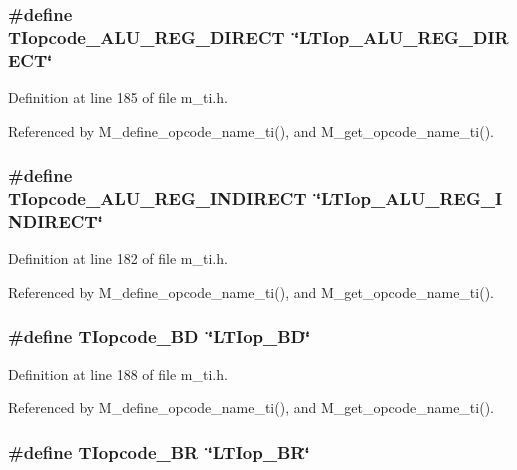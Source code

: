 \subsubsection{\setlength{\rightskip}{0pt plus 5cm}\#define TIopcode\_\-ALU\_\-REG\_\-DIRECT~\char`\"{}LTIop\_\-ALU\_\-REG\_\-DIRECT\char`\"{}}\label{m__ti_8h_d18c754ad75d2456e47ff1854d5aa6a5}




Definition at line 185 of file m\_\-ti.h.

Referenced by M\_\-define\_\-opcode\_\-name\_\-ti(), and M\_\-get\_\-opcode\_\-name\_\-ti().
\subsubsection{\setlength{\rightskip}{0pt plus 5cm}\#define TIopcode\_\-ALU\_\-REG\_\-INDIRECT~\char`\"{}LTIop\_\-ALU\_\-REG\_\-INDIRECT\char`\"{}}\label{m__ti_8h_09babc01669c01321d72d361b3ff69ce}




Definition at line 182 of file m\_\-ti.h.

Referenced by M\_\-define\_\-opcode\_\-name\_\-ti(), and M\_\-get\_\-opcode\_\-name\_\-ti().
\subsubsection{\setlength{\rightskip}{0pt plus 5cm}\#define TIopcode\_\-BD~\char`\"{}LTIop\_\-BD\char`\"{}}\label{m__ti_8h_5f3af1bd50118ab93a13082f76620084}




Definition at line 188 of file m\_\-ti.h.

Referenced by M\_\-define\_\-opcode\_\-name\_\-ti(), and M\_\-get\_\-opcode\_\-name\_\-ti().
\subsubsection{\setlength{\rightskip}{0pt plus 5cm}\#define TIopcode\_\-BR~\char`\"{}LTIop\_\-BR\char`\"{}}\label{m__ti_8h_d84386242b11c09328bdbaf74746ef0e}




